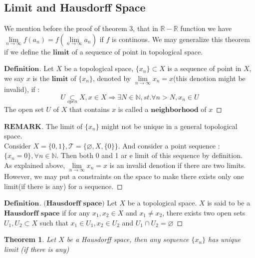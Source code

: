 \documentclass[a4paper, 11pt]{article}
\newtheorem{theorem}{Theorem}
\theoremstyle{definition}
\theoremstyle{remark}
\newenvironment{myremark}
{\renewcommand\qedsymbol{$ $}\begin{proof}[$\mathbf{REMARK}$]}
  {\end{proof}}
\newenvironment{mydef}
{\renewcommand\qedsymbol{$ $}\begin{proof}[$\mathbf{Definition}$]}
  {\end{proof}}
\theoremstyle{definition}
\begin{document}
\subsection{Limit and Hausdorff Space}
We mention before the proof of theorem 3, that in $\mathbb{R}-\mathbb{R}$ function
we have $\lim\limits_{n\to \infty}f(a_n)=f(\lim\limits_{n\to \infty}a_n)$ if 
$f$ is continous. We may generalize this theorem if we
define the $\textbf{limit}$ of a sequence of point in topological space.
\vspace{0.5cm}
\begin{mydef}
        Let $X$ be a topological space, $\{x_n\}\subset X$ is a sequence of point
        in $X$, we say $x$ is the $\textbf{limit}$ of $\{x_n\}$, denoted by
        $\lim\limits_{n\to\infty}x_n=x$(this denotion might be invalid), if :\\
        \indent
        $$
        U\underset{open}{\subset}X, x\in X\Rightarrow
        \exists N\in \mathbb{N}, st. \forall n>N, x_n\in U
        $$ The open set $U$ of $X$ that contains $x$ is called a $\textbf
        {neighborhood}$ of $x$
\end{mydef}
\begin{myremark}
        The limit of $\{x_n\}$ might not be unique in a general topological space. 
\\
\indent
        Consider $X=\{0,1\}, \mathcal{T}=\{\varnothing, X, \{0\}\}$. And consider
        a point sequence :$\{x_n=0\},\forall n\in \mathbb{N}$. Then both 0 and 1 ar         e limit of this sequence by definition.\\
        \indent
        As explained above, $\lim\limits_{n\to\infty} x_n=x$ is an invalid denotion
        if there are two limits. However, we may put a constraints on the space
        to make there exists only one limit(if there is any) for a sequence.
\end{myremark}
\vspace{0.5cm}
\begin{mydef}$\textbf{(Hausdorff space)}$
       Let $X$ be a topological space. $X$ is said to be a $\textbf{Hausdorff 
       space}$ if for any $x_1,x_2\in X$ and $x_1\neq x_2$, there exists two
       open sets $U_1,U_2\subset X$ such that $x_1\in U_1, x_2\in U_2$ and 
       $U_1\cap U_2=\varnothing$
\end{mydef}
\vspace{0.3cm}
\begin{theorem}
        Let $X$ be a Hausdorff space, then any sequence $\{x_n\}$ has unique limit
        (if there is any)
\end{theorem}
\end{document}
